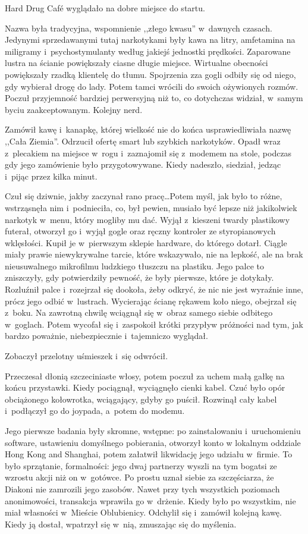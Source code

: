 \documentclass[oneside,polish,11pt,sfheadings]{mwbk}
\begin{document}
Hard Drug Café wyglądało na dobre miejsce do startu.

Nazwa była tradycyjna, wspomnienie ,,złego kwasu'' w~dawnych czasach.
Jedynymi sprzedawanymi tutaj narkotykami były kawa na litry, amfetamina
na miligramy i~psychostymulanty według jakiejś jednostki prędkości.
Zaparowane lustra na ścianie powiększały ciasne długie miejsce.
Wirtualne obecności powiększały rzadką klientelę do tłumu. Spojrzenia
zza gogli odbiły się od niego, gdy wybierał drogę do lady. Potem tamci
wrócili do swoich ożywionych rozmów. Poczuł przyjemność bardziej
perwersyjną niż to, co dotychczas widział, w~samym byciu zaakceptowanym.
Kolejny nerd.

Zamówił kawę i~kanapkę, której wielkość nie do końca usprawiedliwiała
nazwę ,,Cała Ziemia''. Odrzucił ofertę smart lub szybkich narkotyków.
Opadł wraz z~plecakiem na miejsce w~rogu i~zaznajomił się z~modemem na
stole, podczas gdy jego zamówienie było przygotowywane. Kiedy nadeszło,
siedział, jedząc i~pijąc przez kilka minut.

Czuł się dziwnie, jakby zaczynał rano pracę\ldots Potem myśl, jak było to
różne, wstrząsnęła nim i~podnieciła, co, był pewien, musiało być lepsze
niż jakikolwiek narkotyk w~menu, który mogliby mu dać. Wyjął z~kieszeni
twardy plastikowy futerał, otworzył go i~wyjął gogle oraz ręczny
kontroler ze styropianowych wklęsłości. Kupił je w~pierwszym sklepie
hardware, do którego dotarł. Ciągle miały prawie niewykrywalne tarcie,
które wskazywało, nie na lepkość, ale na brak nieusuwalnego mikrofilmu
ludzkiego tłuszczu na plastiku. Jego palce to zniszczyły, gdy
potwierdziły pewność, że były pierwsze, które je dotykały. Rozluźnił
palce i~rozejrzał się dookoła, żeby odkryć, że nic nie jest wyraźnie
inne, prócz jego odbić w~lustrach. Wycierając ścianę rękawem koło niego,
obejrzał się z~boku. Na zawrotną chwilę wciągnął się w~obraz samego
siebie odbitego w~goglach. Potem wycofał się i~zaspokoił krótki przypływ
próżności nad tym, jak bardzo poważnie, niebezpiecznie i~tajemniczo
wyglądał.

Zobaczył przelotny uśmieszek i~się odwrócił.

Przeczesał dłonią szczeciniaste włosy, potem poczuł za uchem małą gałkę
na końcu przystawki. Kiedy pociągnął, wyciągnęło cienki kabel. Czuć było
opór obciążonego kołowrotka, wciągający, gdyby go puścił. Rozwinął cały
kabel i~podłączył go do joypada, a~potem do modemu.

Jego pierwsze badania były skromne, wstępne: po zainstalowaniu i~uruchomieniu software, ustawieniu domyślnego pobierania, otworzył konto
w lokalnym oddziale Hong Kong and Shanghai, potem załatwił likwidację
jego udziału w~firmie. To było sprzątanie, formalności: jego dwaj
partnerzy wyszli na tym bogatsi ze wzrostu akcji niż on w~gotówce. Po
prostu uznał siebie za szczęściarza, że Diakoni nie zamrozili jego
zasobów. Nawet przy tych wszystkich poziomach anonimowości, transakcja
wprawiła go w~drżenie. Kiedy było po wszystkim, nie miał własności w~Mieście Oblubienicy. Odchylił się i~zamówił kolejną kawę. Kiedy ją
dostał, wpatrzył się w~nią, zmuszając się do myślenia.
\end{document}
